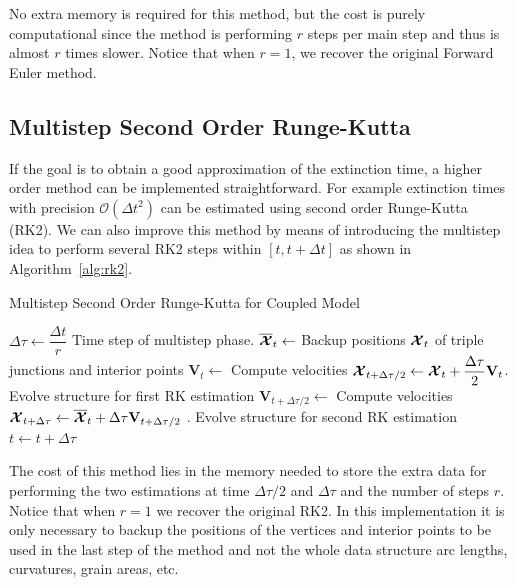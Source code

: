 
No extra memory is required for this method, but the cost is purely computational since the method is performing $r$ steps per main step and thus is almost $r$ times slower.  
Notice that when $r = 1$, we recover the original Forward Euler method.

\subsection{Multistep Second Order Runge-Kutta}

If the goal is to obtain a good approximation of the extinction time, a higher order method can be implemented straightforward. For example extinction times with precision $\mathcal{O}(\Delta t^2)$ can be estimated using second order Runge-Kutta (RK2). We can also improve this method by means of introducing the multistep idea to perform several RK2 steps within $[t,t+\Delta t]$ as shown in Algorithm~\ref{alg:rk2}.

\begin{algorithm}
\caption{Multistep Second Order Runge-Kutta for Coupled Model}
\label{alg:rk2}
\begin{algorithmic}[1]
\State $\Delta \tau \gets \dfrac{\Delta t}{r}$ Time step of multistep phase.
\State $\mathbf{\overline{\bm{\mathcal{X}}}}_t \gets$ Backup positions $\bm{\mathcal{X}}_t$ of triple junctions and interior points
\State $\mathbf{V}_t \gets$ Compute velocities
\State $\bm{\mathcal{X}}_{t + \Delta \tau / 2} \gets \bm{\mathcal{X}}_t + \dfrac{\Delta \tau}{2} \mathbf{V}_t$. Evolve structure for first RK estimation
\State $\mathbf{V}_{t + \Delta \tau /2} \gets$ Compute velocities
\State $\bm{\mathcal{X}}_{t + \Delta \tau} \gets \mathbf{\overline{\bm{\mathcal{X}}}}_t + \Delta \tau \mathbf{V}_{t + \Delta \tau /2}$ . Evolve structure for second RK estimation
\State $t \gets t + \Delta \tau$
\EndFor
\EndProcedure
\end{algorithmic}
\end{algorithm}

The cost of this method lies in the memory needed to store the extra data for performing the two estimations at time $\Delta \tau/2$ and $\Delta \tau$ and the number of steps $r$. Notice that when $r = 1$  we recover the original RK2. In this implementation it is only necessary to backup the positions of the vertices and interior points to be used in the last step of the method and not the whole data structure \ie arc lengths, curvatures, grain areas, etc.

